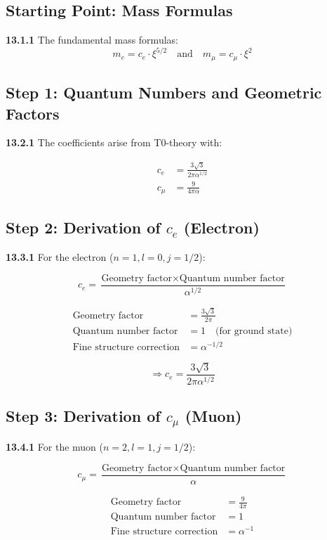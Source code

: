\subsection{Starting Point: Mass Formulas}

\noindent \textbf{13.1.1} The fundamental mass formulas:
\[
m_e = c_e \cdot \xi^{5/2} \quad \text{and} \quad m_\mu = c_\mu \cdot \xi^2
\]

\subsection{Step 1: Quantum Numbers and Geometric Factors}

\noindent \textbf{13.2.1} The coefficients arise from T0-theory with:

\begin{align*}
	c_e &= \frac{3\sqrt{3}}{2\pi\alpha^{1/2}} \\
	c_\mu &= \frac{9}{4\pi\alpha}
\end{align*}

\subsection{Step 2: Derivation of $c_e$ (Electron)}

\noindent \textbf{13.3.1} For the electron ($n=1, l=0, j=1/2$):

\[
c_e = \frac{\text{Geometry factor} \times \text{Quantum number factor}}{\alpha^{1/2}}
\]

\begin{align*}
	\text{Geometry factor} &= \frac{3\sqrt{3}}{2\pi} \\
	\text{Quantum number factor} &= 1 \quad \text{(for ground state)} \\
	\text{Fine structure correction} &= \alpha^{-1/2}
\end{align*}

\[
\Rightarrow c_e = \frac{3\sqrt{3}}{2\pi\alpha^{1/2}}
\]

\subsection{Step 3: Derivation of $c_\mu$ (Muon)}

\noindent \textbf{13.4.1} For the muon ($n=2, l=1, j=1/2$):

\[
c_\mu = \frac{\text{Geometry factor} \times \text{Quantum number factor}}{\alpha}
\]

\begin{align*}
	\text{Geometry factor} &= \frac{9}{4\pi} \\
	\text{Quantum number factor} &= 1 \\
	\text{Fine structure correction} &= \alpha^{-1}
\end{align*}

